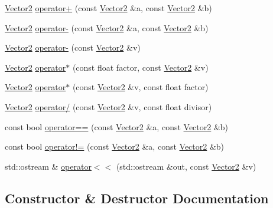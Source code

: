 \begin{DoxyCompactItemize}
\item 
\hyperlink{classprism_1_1_vector2}{Vector2} \hyperlink{classprism_1_1_vector2_a43adb85199fdc6ae1f9ba0397660ad9a}{operator+} (const \hyperlink{classprism_1_1_vector2}{Vector2} \&a, const \hyperlink{classprism_1_1_vector2}{Vector2} \&b)
\item 
\hyperlink{classprism_1_1_vector2}{Vector2} \hyperlink{classprism_1_1_vector2_a6132994fe4bbe4bd94b3bd1dbb83d5cf}{operator-\/} (const \hyperlink{classprism_1_1_vector2}{Vector2} \&a, const \hyperlink{classprism_1_1_vector2}{Vector2} \&b)
\item 
\hyperlink{classprism_1_1_vector2}{Vector2} \hyperlink{classprism_1_1_vector2_a3f08196e8b25ab8789db503aa50ae564}{operator-\/} (const \hyperlink{classprism_1_1_vector2}{Vector2} \&v)
\item 
\hyperlink{classprism_1_1_vector2}{Vector2} \hyperlink{classprism_1_1_vector2_afe2f3c89eb55595919121a94cfaa4c81}{operator$\ast$} (const float factor, const \hyperlink{classprism_1_1_vector2}{Vector2} \&v)
\item 
\hyperlink{classprism_1_1_vector2}{Vector2} \hyperlink{classprism_1_1_vector2_ad0b580b5cac3d5fdf13ac4db0c85be2b}{operator$\ast$} (const \hyperlink{classprism_1_1_vector2}{Vector2} \&v, const float factor)
\item 
\hyperlink{classprism_1_1_vector2}{Vector2} \hyperlink{classprism_1_1_vector2_a41289aa7adf3d51186f6c2805e5d0fa6}{operator/} (const \hyperlink{classprism_1_1_vector2}{Vector2} \&v, const float divisor)
\item 
const bool \hyperlink{classprism_1_1_vector2_a1393036fc72fa2140bdada67b3715d93}{operator==} (const \hyperlink{classprism_1_1_vector2}{Vector2} \&a, const \hyperlink{classprism_1_1_vector2}{Vector2} \&b)
\item 
const bool \hyperlink{classprism_1_1_vector2_a6994cbd6248d3523a38ee0f20cce9c85}{operator!=} (const \hyperlink{classprism_1_1_vector2}{Vector2} \&a, const \hyperlink{classprism_1_1_vector2}{Vector2} \&b)
\item 
std\+::ostream \& \hyperlink{classprism_1_1_vector2_a077027eaf020d591b263437d2949c850}{operator$<$$<$} (std\+::ostream \&out, const \hyperlink{classprism_1_1_vector2}{Vector2} \&v)
\end{DoxyCompactItemize}


\subsection{Constructor \& Destructor Documentation}
